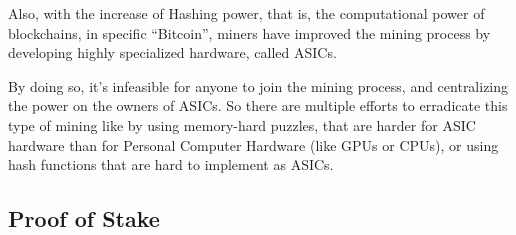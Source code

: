 Also, with the increase of Hashing power, that is, the computational power of blockchains, in specific ``Bitcoin'', miners have improved the mining process by developing highly specialized hardware, called ASICs.

By doing so, it's infeasible for anyone to join the mining process, and centralizing the power on the owners of ASICs. So there are multiple efforts to erradicate this type of mining like by using memory-hard puzzles, that are harder for ASIC hardware than for Personal Computer Hardware (like GPUs or CPUs), or using hash functions that are hard to implement as ASICs.

\subsection{\textbf{Proof of Stake}}

\subsection{\textbf{}}


